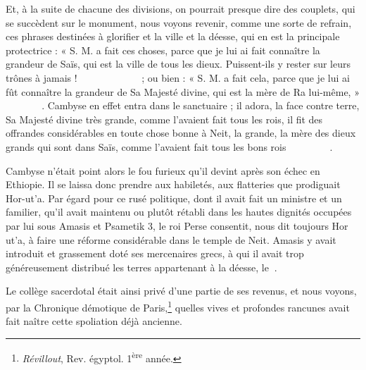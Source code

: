 \documentclass[a4paper, 11pt, oneside]{article}
\newcommand*\hieroAAAH{}
\newcommand*\hieroAAAO{}
\newcommand*\hieroAAAW{\raisebox{0.5ex}{}}
\newcommand*\hieroAAAX{}
\newcommand*\hieroAABC{\raisebox{0.5ex}{}}
\newcommand*\hieroAABR{}
\newcommand*\hieroAACB{\raisebox{0.5ex}{}}
\newcommand*\hieroAACM{}
\newcommand*\hieroAACN{\raisebox{1ex}{}}
\newcommand*\hieroAACS{}
\newcommand*\hieroAACW{}
\newcommand*\hieroAADS{}
\newcommand*\hieroAAEC{}
\newcommand*\hieroAAEK{}
\newcommand*\hieroAAFH{}
\newcommand*\hieroAAFN{\raisebox{0.5ex}{}}
\newcommand*\hieroAAHC{}
\newcommand*\hieroAAHW{}
\newcommand*\hieroAAHZ{}
\newcommand*\hieroAAIA{\raisebox{0.3ex}{}}
\newcommand*\hieroAAIF{}
\newcommand*\hieroAAIS{}
\newcommand*\hieroAAKE{}
\newcommand*\hieroAAKO{}
\newcommand*\hieroAAKT{}
\newcommand*\hieroAAKY{}
\newcommand*\hieroAALP{}
\newcommand*\hieroAARU{}
\newcommand*\hieroAAWO{}
\newcommand*\hieroAAYI{\raisebox{0.5ex}{}}
\newcommand*\hieroABAV{}
\newcommand*\hieroABBP{}
\newcommand*\hieroABBQ{}
\newcommand*\hieroABBR{\raisebox{0.5ex}{}}
\newcommand*\hieroABBS{}
\newcommand*\hieroABBT{}
\newcommand*\hieroABBU{\raisebox{0.3ex}{}}
\newcommand*\hieroABBV{}
\newcommand*\hieroABBW{}
\newcommand*\hieroABBX{}
\newcommand*\hieroABBY{}
\newcommand*\hieroABBZ{}
\newcommand*\hieroABCA{}
\newcommand*\hieroABCB{}
\newcommand*\hieroABCC{}
\newcommand*\hieroABCD{}
\newcommand*\hieroABCE{}
\begin{document}
Et, à la suite de chacune des divisions, on pourrait presque dire des couplets, qui se succèdent sur le monument, nous voyons revenir, comme une sorte de refrain, ces phrases destinées à glorifier et la ville et la déesse, qui en est la principale protectrice : « S. M. a fait ces choses, parce que je lui ai fait connaître la grandeur de Saïs, qui est la ville de tous les dieux. Puissent-ils y rester sur leurs trônes à jamais ! $\hieroAAKT\:\hieroAALP\:\hieroAAFN\allowbreak\:\hieroABBP\:\hieroABBP\:\hieroAAEC\allowbreak\:\hieroABBQ\:\hieroAAKE\:\hieroABBR\allowbreak\:\hieroABBS\:\hieroABAV\:\hieroAACW\allowbreak\:\hieroAAAW\:\hieroABBT\:\hieroAAHZ\allowbreak\:\hieroAAIA\:\hieroAAEK\:\hieroAAEK\:\hieroAAEK\allowbreak\:\hieroAABC\:\hieroAAFH\:\hieroABBU\allowbreak\:\hieroABBV\:\hieroAAAH\:\hieroAABR\allowbreak\:\hieroAAFN\:\hieroAAWO$ ; ou bien : « S. M. a fait cela, parce que je lui ai fût connaître la grandeur de Sa Majesté divine, qui est la mère de Ra lui-même, » $\hieroAAKT\:\hieroABBW\:\hieroABBP\allowbreak\:\hieroABBP\:\hieroAAYI\:\hieroABBQ\allowbreak\:\hieroABBX\:\hieroABBY\:\hieroABBZ\allowbreak\:\hieroAAHC\:\hieroAACS\:\hieroABCA\allowbreak\:\hieroAAKO\:\hieroAAHZ\:\hieroAAIA\allowbreak\:\hieroAAIF\:\hieroABCB$. Cambyse en effet entra dans le sanctuaire ; il adora, la face contre terre, Sa Majesté divine très grande, comme l'avaient fait tous les rois, il fit des offrandes considérables en toute chose bonne à Neit, la grande, la mère des dieux grands qui sont dans Saïs, comme l'avaient fait tous les bons rois $\hieroAACN\:\hieroAAAO\:\hieroAARU\allowbreak\:\hieroAAEK\:\hieroAACB\:\hieroAAKO\allowbreak\:\hieroAAEK\:\hieroAAEK\:\hieroAAEK\allowbreak\:\hieroAAKY\:\hieroAAHW\:\hieroAACM\allowbreak\:\hieroABCC\:\hieroAAAW\:\hieroAAIS\allowbreak\:\hieroAAKT\:\hieroAAAX\allowbreak\:\hieroABCD\:\hieroABCE$.

Cambyse n'était point alors le fou furieux qu'il devint après son échec en Ethiopie. Il se laissa donc prendre aux habiletés, aux flatteries que prodiguait Hor-ut'a. Par égard pour ce rusé politique, dont il avait fait un ministre et un familier, qu'il avait maintenu ou plutôt rétabli dans les hautes dignités occupées par lui sous Amasis et Psametik 3, le roi Perse consentit, nous dit toujours Hor ut'a, à faire une réforme considérable dans le temple de Neit. Amasis y avait introduit et grassement doté ses mercenaires grecs, à qui il avait trop généreusement distribué les terres appartenant à la déesse, le $\hieroAAEK\:\hieroAADS$.

Le collège sacerdotal était ainsi privé d'une partie de ses revenus, et nous voyons, par la Chronique démotique de Paris,\footnote{\emph{Révillout}, Rev. égyptol. 1\textsuperscript{ère} année.} quelles vives et profondes rancunes avait fait naître cette spoliation déjà ancienne.
\end{document}
